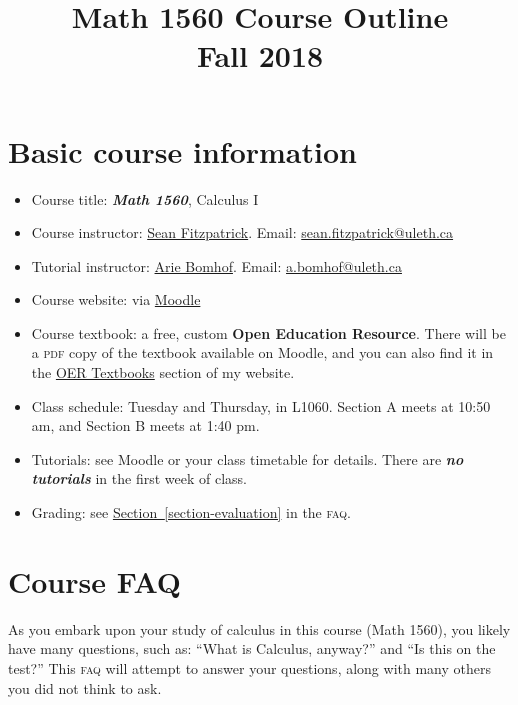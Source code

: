 \documentclass[10pt,]{article}
\title{Math 1560 Course Outline\\
{\large Fall 2018}}
\date{}
\newcommand{\initialism}[1]{\textsc{\MakeLowercase{#1}}}
\DeclareRobustCommand{\initialismintitle}[1]{\texorpdfstring{#1}{#1}}
\newcommand{\alert}[1]{\textbf{\textit{#1}}}
\newcommand{\terminology}[1]{\textbf{#1}}
\begin{document}
\hypertarget{calculus-outline}{}
\maketitle
\thispagestyle{empty}
%
%
\typeout{************************************************}
\typeout{************************************************}
%
\section[{Basic course information}]{Basic course information}\label{section-basics}
\hypertarget{p-1}{}%
\leavevmode%
\begin{itemize}[label=]
\item{}Course title: \alert{Math 1560}, Calculus I%
\item{}Course instructor: \href{http://www.cs.uleth.ca/\~fitzpat}{Sean Fitzpatrick}. Email: \href{mailto:sean.fitzpatrick@uleth.ca}{sean.fitzpatrick@uleth.ca}%
\item{}Tutorial instructor: \href{http://www.cs.uleth.ca/\~bomhof}{Arie Bomhof}. Email: \href{mailto:a.bomhof@uleth.ca}{a.bomhof@uleth.ca}%
\item{}Course website: via \href{https://moodle.uleth.ca}{Moodle}%
\item{}Course textbook: a free, custom \terminology{Open Education Resource}. There will be a \initialism{PDF} copy of the textbook available on Moodle, and you can also find it in the \href{http://www.cs.uleth.ca/\~fitzpat/oer.html}{OER Textbooks} section of my website.%
\item{}Class schedule: Tuesday and Thursday, in L1060. Section A meets at 10:50 am, and Section B meets at 1:40 pm.%
\item{}Tutorials: see Moodle or your class timetable for details. There are \alert{no tutorials} in the first week of class.%
\item{}Grading: see \hyperref[section-evaluation]{Section~\ref{section-evaluation}} in the \initialism{FAQ}.%
\end{itemize}
%
%
%
\typeout{************************************************}
\typeout{Section 2 Course \initialismintitle{FAQ}}
\typeout{************************************************}
%
\section[{Course \initialismintitle{FAQ}}]{Course \initialismintitle{FAQ}}\label{section-FAQ}
\hypertarget{p-2}{}%
As you embark upon your study of calculus in this course (Math 1560), you likely have many questions, such as: ``What is Calculus, anyway?'' and ``Is this on the test?'' This \initialism{FAQ} will attempt to answer your questions, along with many others you did not think to ask.%
%
%
\typeout{************************************************}
\typeout{************************************************}
%
\end{document}
